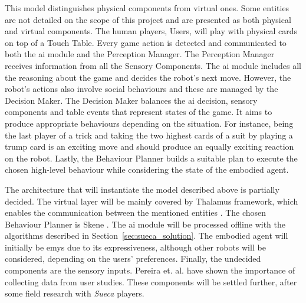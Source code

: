 This model distinguishes physical components from virtual ones.
Some entities are not detailed on the scope of this project and are presented as both physical and virtual components.
The human players, Users, will play with physical cards on top of a Touch Table.
Every game action is detected and communicated to both the \gls{ai} module and the Perception Manager.
The Perception Manager receives information from all the Sensory Components.
The \gls{ai} module includes all the reasoning about the game and decides the robot's next move.
However, the robot's actions also involve social behaviours and these are managed by the Decision Maker.
The Decision Maker balances the \gls{ai} decision, sensory components and table events that represent states of the game.
It aims to produce appropriate behaviours depending on the situation.
For instance, being the last player of a trick and taking the two highest cards of a suit by playing a trump card is an exciting move and should produce an equally exciting reaction on the robot.
Lastly, the Behaviour Planner builds a suitable plan to execute the chosen high-level behaviour while considering the state of the embodied agent.

The architecture that will instantiate the model described above is partially decided.
The virtual layer will be mainly covered by Thalamus framework, which enables the communication between the mentioned entities \cite{Ribeiro}.
The chosen Behaviour Planner is Skene \cite{Ribeiroa}.
The \gls{ai} module will be processed offline with the algorithms described in Section~\ref{sec:sueca_solution}.
The embodied agent will initially be \gls{emys} due to its expressiveness, although other robots will be considered, depending on the users' preferences.
Finally, the undecided components are the sensory inputs.
Pereira et. al. have shown the importance of collecting data from user studies.
These components will be settled further, after some field research with \emph{Sueca} players.









